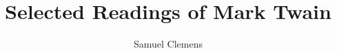 \documentclass{novelette} %
\title{Selected Readings of Mark Twain}
\author{Samuel Clemens}
\begin{document}
\frontmatter


\mainmatter
\header{\thetitle}{\theauthor}



\end{document}
